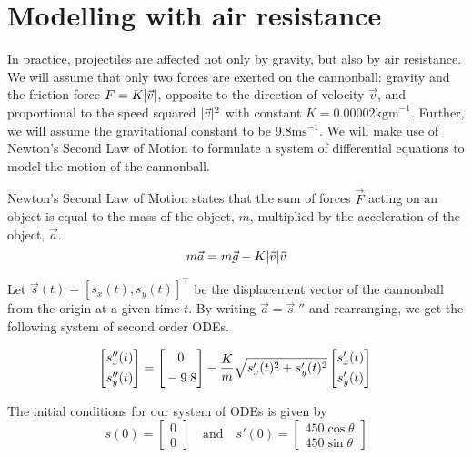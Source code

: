 \section{Modelling with air resistance}
In practice, projectiles are affected not only by gravity, but also by air resistance. We will assume that only two forces are exerted on the cannonball: gravity and the friction force $F  = K \lvert\vec{v}\rvert$, opposite to the direction of velocity $\vec{v}$, and proportional to the speed squared $\lvert\vec{v}\rvert^2$ with constant $K = 0.00002\text{kgm}^{-1}$. Further, we will assume the gravitational constant to be 9.8$\text{ms}^{-1}$. We will make use of Newton's Second Law of Motion to formulate a system of differential equations to model the motion of the cannonball.



\newpage
\noindent
Newton's Second Law of Motion states that the sum of forces $\vec{F}$ acting on an object is equal to the mass of the object, $m$, multiplied by the acceleration of the object, $\vec{a}$.
$$m\vec{a} = m\vec{g} - K\lvert\vec{v}\rvert\vec{v}$$

\noindent
Let $\vec{s}(t) = [s_x(t), s_y(t)]^\top$ be the displacement vector of the cannonball from the origin at a given time $t$. By writing $\vec{a} = \vec{s}\;''$ and rearranging, we get the following system of second order ODEs.

$$
\begin{bmatrix}
	\matrixspacinghack s''_x(t) \\
	\matrixspacinghack s''_y(t) 	
\end{bmatrix}
=
\begin{bmatrix}
	\matrixspacinghack 0 \\
	\matrixspacinghack -9.8	
\end{bmatrix}
-
\frac{K}{m}\sqrt{s'_x(t)^2 + s'_y(t)^2}
\begin{bmatrix}
	\matrixspacinghack s'_x(t) \\
	\matrixspacinghack s'_y(t)	
\end{bmatrix} \\
$$


\noindent
The initial conditions for our system of ODEs is given by
$$s(0) = \begin{bmatrix} 0 \\ 0 \end{bmatrix} \quad \text{and} \quad s'(0) = \begin{bmatrix} 450 \cos \theta \\ 450 \sin \theta \end{bmatrix}$$

